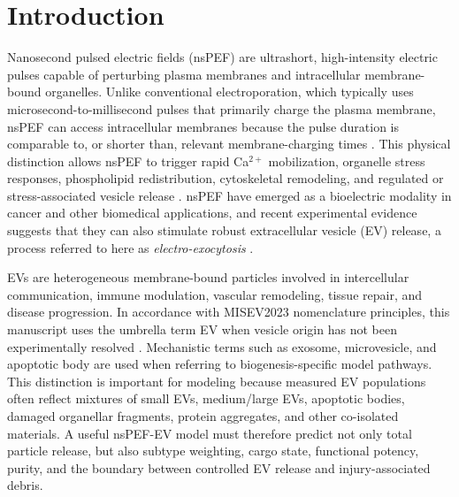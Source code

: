 \documentclass[Afour,sagev,times]{sagej}
\begin{document}
\section{Introduction}
Nanosecond pulsed electric fields (nsPEF) are ultrashort, high-intensity electric pulses capable of perturbing plasma membranes and intracellular membrane-bound organelles. Unlike conventional electroporation, which typically uses microsecond-to-millisecond pulses that primarily charge the plasma membrane, nsPEF can access intracellular membranes because the pulse duration is comparable to, or shorter than, relevant membrane-charging times \cite{beebe2003nanosecond,vernier2003calcium,semenov2013primary}. This physical distinction allows nsPEF to trigger rapid Ca$^{2+}$ mobilization, organelle stress responses, phospholipid redistribution, cytoskeletal remodeling, and regulated or stress-associated vesicle release \cite{beebe2012transient,pakhomova2013two,muratori2017activation}. nsPEF have emerged as a bioelectric modality in cancer and other biomedical applications, and recent experimental evidence suggests that they can also stimulate robust extracellular vesicle (EV) release, a process referred to here as \textit{electro-exocytosis} \cite{manoochehri2025extracellular}.

EVs are heterogeneous membrane-bound particles involved in intercellular communication, immune modulation, vascular remodeling, tissue repair, and disease progression. In accordance with MISEV2023 nomenclature principles, this manuscript uses the umbrella term EV when vesicle origin has not been experimentally resolved \cite{welsh2024minimal}. Mechanistic terms such as exosome, microvesicle, and apoptotic body are used when referring to biogenesis-specific model pathways. This distinction is important for modeling because measured EV populations often reflect mixtures of small EVs, medium/large EVs, apoptotic bodies, damaged organellar fragments, protein aggregates, and other co-isolated materials. A useful nsPEF-EV model must therefore predict not only total particle release, but also subtype weighting, cargo state, functional potency, purity, and the boundary between controlled EV release and injury-associated debris.
\end{document}
